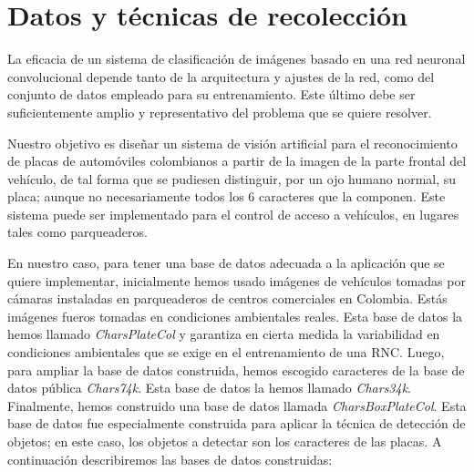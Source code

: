     
    
    
    
   

\section{Datos y técnicas de recolección}
La eficacia de un sistema de clasificación de imágenes basado en una red neuronal convolucional depende tanto de la arquitectura y ajustes de la red, como del conjunto de datos empleado para su entrenamiento. Este último debe ser suficientemente amplio y representativo del problema que se quiere resolver.

Nuestro objetivo es diseñar un sistema de visión artificial para el reconocimiento de placas de automóviles colombianos a partir de la imagen de la parte frontal del vehículo, de tal forma que se pudiesen distinguir, por un ojo humano normal, su placa; aunque no necesariamente todos los 6 caracteres que la componen. Este sistema puede ser implementado para el control de acceso a vehículos, en lugares tales como  parqueaderos.

En nuestro caso, para tener una base de datos adecuada a la aplicación que se quiere implementar, inicialmente hemos usado imágenes de vehículos tomadas por cámaras instaladas en parqueaderos de centros comerciales en Colombia. Estás imágenes fueros tomadas en condiciones ambientales reales. Esta base de datos la hemos llamado \textit{CharsPlateCol} y garantiza en cierta medida la variabilidad en condiciones ambientales que se exige en el entrenamiento de una RNC. Luego, para ampliar la base de datos construida, hemos escogido caracteres de la base de datos pública \textit{Chars74k}. Esta base de datos la hemos llamado \textit{Chars34k}. Finalmente, hemos construido una base de datos llamada \textit{CharsBoxPlateCol}. Esta base de datos fue especialmente construida para aplicar la técnica de detección de objetos; en este caso, los objetos a detectar son los caracteres de las placas.  
A continuación describiremos las bases de datos construidas:

